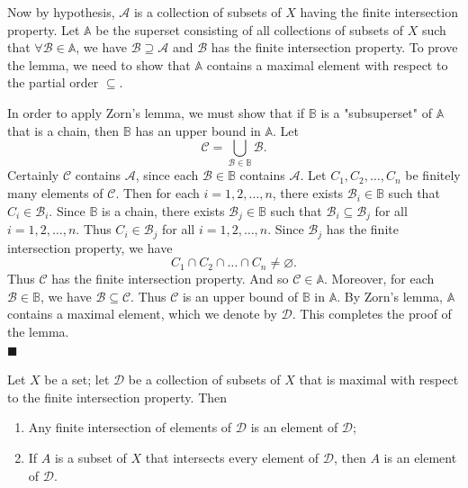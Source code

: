 \documentclass[main.tex]{subfiles}
\begin{document}
\par Now by hypothesis, $\mathcal{A}$ is a collection of subsets of $X$ having the finite intersection property. Let $\mathbb{A}$ be the superset consisting of all collections of subsets of $X$ such that $\forall \mathcal{B} \in \mathbb{A}$, we have $\mathcal{B} \supseteq \mathcal{A}$ and $\mathcal{B}$ has the finite intersection property. To prove the lemma, we need to show that $\mathbb{A}$ contains a maximal element with respect to the partial order $\subseteq$. 
\par In order to apply Zorn's lemma, we must show that if $\mathbb{B}$ is a "subsuperset" of $\mathbb{A}$ that is a chain, then $\mathbb{B}$ has an upper bound in $\mathbb{A}$. Let 
\begin{equation}
    \mathcal{C} = \bigcup_{\mathcal{B} \in \mathbb{B}} \mathcal{B}.
\end{equation}
Certainly $\mathcal{C}$ contains $\mathcal{A}$, since each $\mathcal{B} \in \mathbb{B}$ contains $\mathcal{A}$. Let $C_1, C_2, \ldots, C_n$ be finitely many elements of $\mathcal{C}$. Then for each $i = 1, 2, \ldots, n$, there exists $\mathcal{B}_i \in \mathbb{B}$ such that $C_i \in \mathcal{B}_i$. Since $\mathbb{B}$ is a chain, there exists $\mathcal{B}_j \in \mathbb{B}$ such that $\mathcal{B}_i \subseteq \mathcal{B}_j$ for all $i = 1, 2, \ldots, n$. Thus $C_i \in \mathcal{B}_j$ for all $i = 1, 2, \ldots, n$. Since $\mathcal{B}_j$ has the finite intersection property, we have 
\begin{equation}
    C_1 \cap C_2 \cap \ldots \cap C_n \neq \varnothing.
\end{equation}
Thus $\mathcal{C}$ has the finite intersection property. And so $\mathcal{C} \in \mathbb{A}$. Moreover, for each $\mathcal{B} \in \mathbb{B}$, we have $\mathcal{B} \subseteq \mathcal{C}$. Thus $\mathcal{C}$ is an upper bound of $\mathbb{B}$ in $\mathbb{A}$. By Zorn's lemma, $\mathbb{A}$ contains a maximal element, which we denote by $\mathcal{D}$. This completes the proof of the lemma. 
\mbox{} \\ \null \hfill $\blacksquare$ 
\begin{lemma}
    Let $X$ be a set; let $\mathcal{D}$ be a collection of subsets of $X$ that is maximal with respect to the finite intersection property. Then 
    \begin{enumerate}
        \item Any finite intersection of elements of $\mathcal{D}$ is an element of $\mathcal{D}$; 
        \item If $A$ is a subset of $X$ that intersects every element of $\mathcal{D}$, then $A$ is an element of $\mathcal{D}$. 
    \end{enumerate}
\end{lemma}
\end{document}
